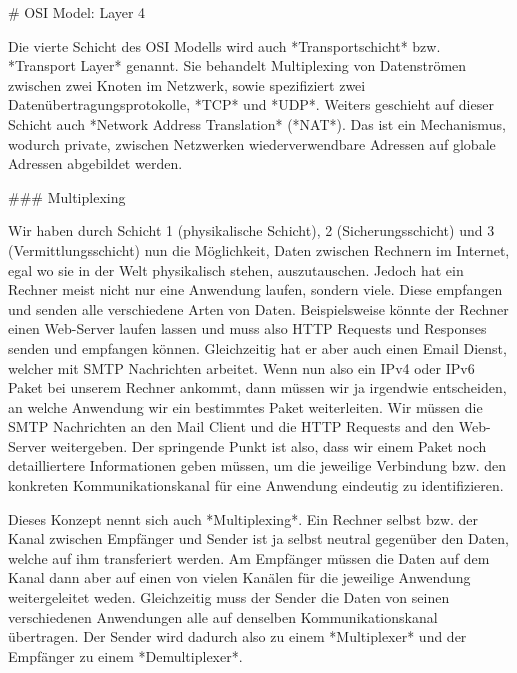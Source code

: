 # OSI Model: Layer 4

Die vierte Schicht des OSI Modells wird auch *Transportschicht* bzw. *Transport
Layer* genannt. Sie behandelt Multiplexing von Datenströmen zwischen zwei Knoten
im Netzwerk, sowie spezifiziert zwei Datenübertragungsprotokolle, *TCP* und
*UDP*. Weiters geschieht auf dieser Schicht auch *Network Address Translation*
(*NAT*). Das ist ein Mechanismus, wodurch private, zwischen Netzwerken
wiederverwendbare Adressen auf globale Adressen abgebildet werden.

### Multiplexing

Wir haben durch Schicht 1 (physikalische Schicht), 2 (Sicherungsschicht) und 3
(Vermittlungsschicht) nun die Möglichkeit, Daten zwischen Rechnern im Internet,
egal wo sie in der Welt physikalisch stehen, auszutauschen. Jedoch hat ein
Rechner meist nicht nur eine Anwendung laufen, sondern viele. Diese empfangen
und senden alle verschiedene Arten von Daten. Beispielsweise könnte der Rechner
einen Web-Server laufen lassen und muss also HTTP Requests und Responses senden
und empfangen können. Gleichzeitig hat er aber auch einen Email Dienst, welcher
mit SMTP Nachrichten arbeitet. Wenn nun also ein IPv4 oder IPv6 Paket bei
unserem Rechner ankommt, dann müssen wir ja irgendwie entscheiden, an welche
Anwendung wir ein bestimmtes Paket weiterleiten. Wir müssen die SMTP Nachrichten
an den Mail Client und die HTTP Requests and den Web-Server weitergeben. Der
springende Punkt ist also, dass wir einem Paket noch detailliertere
Informationen geben müssen, um die jeweilige Verbindung bzw. den konkreten
Kommunikationskanal für eine Anwendung eindeutig zu identifizieren.

Dieses Konzept nennt sich auch *Multiplexing*. Ein Rechner selbst bzw. der Kanal
zwischen Empfänger und Sender ist ja selbst neutral gegenüber den Daten, welche
auf ihm transferiert werden. Am Empfänger müssen die Daten auf dem Kanal dann
aber auf einen von vielen Kanälen für die jeweilige Anwendung weitergeleitet
weden. Gleichzeitig muss der Sender die Daten von seinen verschiedenen
Anwendungen alle auf denselben Kommunikationskanal übertragen. Der Sender wird
dadurch also zu einem *Multiplexer* und der Empfänger zu einem *Demultiplexer*.

